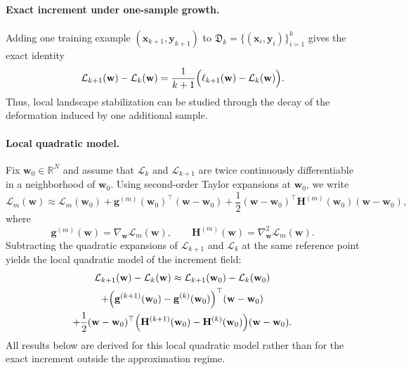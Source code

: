 \documentclass[10pt]{article}
\theoremstyle{plain}
\theoremstyle{remark}
\begin{document}
\paragraph{Exact increment under one-sample growth.}
Adding one training example $(\mathbf x_{k+1}, \mathbf y_{k+1})$ to $\mathfrak D_k = \{(\mathbf x_i, \mathbf y_i)\}_{i=1}^k$ gives the exact identity
\begin{equation}
\label{eq:loss-increment-exact}
\mathcal L_{k+1}(\mathbf w)-\mathcal L_k(\mathbf w)
=
\frac{1}{k+1}\Bigl(\ell_{k+1}(\mathbf w)-\mathcal L_k(\mathbf w)\Bigr).
\end{equation}
Thus, local landscape stabilization can be studied through the decay of the deformation induced by one additional sample.

\paragraph{Local quadratic model.}
Fix $\mathbf w_0\in\mathbb R^N$ and assume that $\mathcal L_k$ and $\mathcal L_{k+1}$ are twice continuously differentiable in a neighborhood of $\mathbf w_0$.
Using second-order Taylor expansions at $\mathbf w_0$, we write
\begin{equation}
\label{eq:taylor-quadratic}
\mathcal L_m(\mathbf w)
\approx
\mathcal L_m(\mathbf w_0)
+
\mathbf g^{(m)}(\mathbf w_0)^\top(\mathbf w-\mathbf w_0)
+
\frac12(\mathbf w-\mathbf w_0)^\top \mathbf H^{(m)}(\mathbf w_0)(\mathbf w-\mathbf w_0),
\end{equation}
where
\[
\mathbf g^{(m)}(\mathbf w)=\nabla_{\mathbf w}\mathcal L_m(\mathbf w),
\qquad
\mathbf H^{(m)}(\mathbf w)=\nabla_{\mathbf w}^2\mathcal L_m(\mathbf w).
\]
Subtracting the quadratic expansions of $\mathcal L_{k+1}$ and $\mathcal L_k$ at the same reference point yields the local quadratic model of the increment field:
\begin{multline}
\label{eq:loss-diff-second}
\mathcal L_{k+1}(\mathbf w)-\mathcal L_k(\mathbf w)
\approx
\mathcal L_{k+1}(\mathbf w_0)-\mathcal L_k(\mathbf w_0)
\\
+
\Bigl(\mathbf g^{(k+1)}(\mathbf w_0)-\mathbf g^{(k)}(\mathbf w_0)\Bigr)^\top(\mathbf w-\mathbf w_0)
\\
+
\frac12(\mathbf w-\mathbf w_0)^\top
\Bigl(\mathbf H^{(k+1)}(\mathbf w_0)-\mathbf H^{(k)}(\mathbf w_0)\Bigr)
(\mathbf w-\mathbf w_0).
\end{multline}
All results below are derived for this local quadratic model rather than for the exact increment outside the approximation regime.
\end{document}
